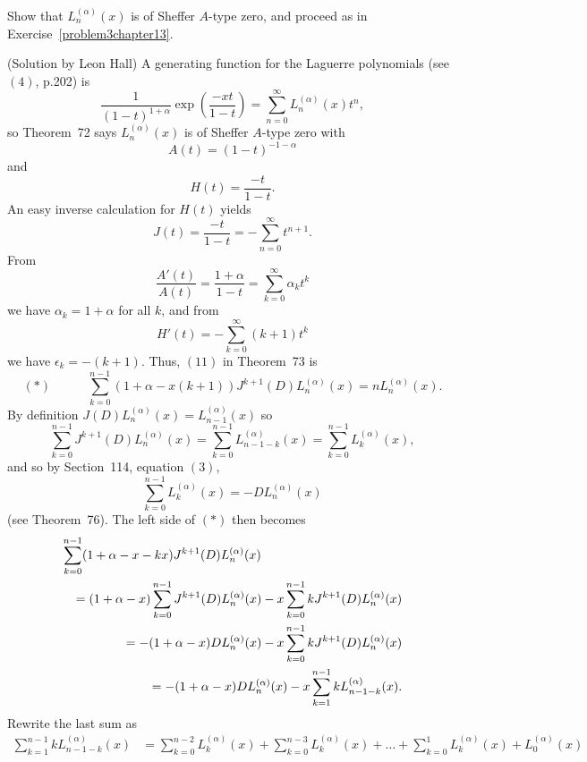 \begin{problem}\label{problem4chapter13}
Show that $L_n^{(\alpha)}(x)$ is of Sheffer $A$-type zero, and proceed as in Exercise~\ref{problem3chapter13}.
\end{problem}
\begin{solution}(Solution by Leon Hall)
A generating function for the Laguerre polynomials (see $(4)$, p.202) is 
$$\dfrac{1}{(1-t)^{1+\alpha}} \exp \left( \dfrac{-xt}{1-t} \right) = \displaystyle\sum_{n=0}^{\infty} L_n^{(\alpha)}(x)t^n,$$
so Theorem~72 says $L_n^{(\alpha)}(x)$ is of Sheffer $A$-type zero with
$$A(t)=(1-t)^{-1-\alpha}$$
and
$$H(t)=\dfrac{-t}{1-t}.$$
An easy inverse calculation for $H(t)$ yields 
$$J(t) = \dfrac{-t}{1-t} = -\displaystyle\sum_{n=0}^{\infty} t^{n+1}.$$
From 
$$\dfrac{A'(t)}{A(t)} = \dfrac{1+\alpha}{1-t} = \displaystyle\sum_{k=0}^{\infty} \alpha_k t^k$$
we have $\alpha_k=1+\alpha$ for all $k$, and from
$$H'(t)=-\displaystyle\sum_{k=0}^{\infty} (k+1)t^k$$
we have $\epsilon_k=-(k+1)$. Thus, $(11)$ in Theorem~73 is
$$(*) \hspace{35pt} \displaystyle\sum_{k=0}^{n-1} (1+\alpha-x(k+1))J^{k+1}(D)L_n^{(\alpha)}(x) = nL_n^{(\alpha)}(x).$$
By definition $J(D)L_n^{(\alpha)}(x) = L_{n-1}^{(\alpha)}(x)$ so
$$\displaystyle\sum_{k=0}^{n-1} J^{k+1}(D) L_n^{(\alpha)}(x) = \displaystyle\sum_{k=0}^{n-1} L_{n-1-k}^{(\alpha)}(x) = \displaystyle\sum_{k=0}^{n-1} L_k^{(\alpha)}(x),$$
and so by Section~114, equation $(3)$, 
$$\displaystyle\sum_{k=0}^{n-1} L_k^{(\alpha)}(x) = -D L_n^{(\alpha)}(x)$$
(see Theorem~76). The left side of $(*)$ then becomes
\begin{eqnarray*}
\lefteqn{\displaystyle\sum_{k=0}^{n-1} (1+\alpha-x-kx)J^{k+1}(D)L_n^{(\alpha)}(x)} \\
& &= (1+\alpha-x) \displaystyle\sum_{k=0}^{n-1} J^{k+1}(D)L_n^{(\alpha)}(x) - x\displaystyle\sum_{k=0}^{n-1} kJ^{k+1}(D)L_n^{(\alpha)}(x) \\
& &=-(1+\alpha-x)DL_n^{(\alpha)}(x)-x\displaystyle\sum_{k=0}^{n-1} kJ^{k+1}(D)L_n^{(\alpha)}(x) \\
& &= -(1+\alpha-x)DL_n^{(\alpha)}(x)-x\displaystyle\sum_{k=1}^{n-1} kL_{n-1-k}^{(\alpha)}(x).
\end{eqnarray*}
Rewrite the last sum as
$$\begin{array}{ll}
\displaystyle\sum_{k=1}^{n-1} kL_{n-1-k}^{(\alpha)}(x) &= \displaystyle\sum_{k=0}^{n-2} L_k^{(\alpha)}(x) + \displaystyle\sum_{k=0}^{n-3} L_k^{(\alpha)}(x) + \ldots + \displaystyle\sum_{k=0}^1 L_k^{(\alpha)}(x) + L_0^{(\alpha)}(x) \\

\end{array}$$
\end{solution}
